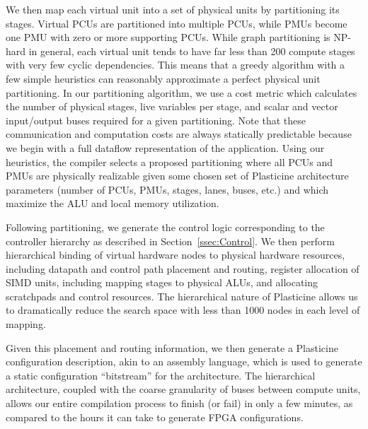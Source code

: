 We then map each virtual unit into a set of physical units by partitioning its stages.
Virtual PCUs are partitioned into multiple PCUs, while PMUs become one PMU with zero or more supporting PCUs.
While graph partitioning is NP-hard in general, each virtual unit tends to have far less than 200 compute stages with very few cyclic dependencies.
This means that a greedy algorithm with a few simple heuristics can reasonably approximate a perfect physical unit partitioning.
In our partitioning algorithm, we use a cost metric which calculates the number of physical stages, live variables per stage, and scalar and vector input/output buses required for a given partitioning.
Note that these communication and computation costs are always statically predictable because we begin with a full dataflow representation of the application.
Using our heuristics, the compiler selects a proposed partitioning
where all PCUs and PMUs are physically realizable given some chosen set of
Plasticine architecture parameters (number of PCUs, PMUs, stages, lanes, buses, etc.) and which maximize the ALU and local memory utilization.

Following partitioning, we generate the control logic corresponding to the controller hierarchy
as described in Section~\ref{ssec:Control}. We then perform hierarchical binding of virtual hardware nodes to physical hardware
resources, including datapath and control path placement and routing, register allocation of SIMD
units, including mapping stages to physical ALUs, and allocating scratchpads and control resources. The hierarchical nature of Plasticine allows us to
dramatically reduce the search space with less than 1000 nodes in each level of mapping.

Given this placement and routing information, we then generate a Plasticine configuration description, akin to an assembly language, which is
used to generate a static configuration ``bitstream'' for the architecture.
The hierarchical architecture, coupled with the coarse granularity of buses between compute units, allows our entire
compilation process to finish (or fail) in only a few minutes, as compared to the hours it can take to generate FPGA configurations.

